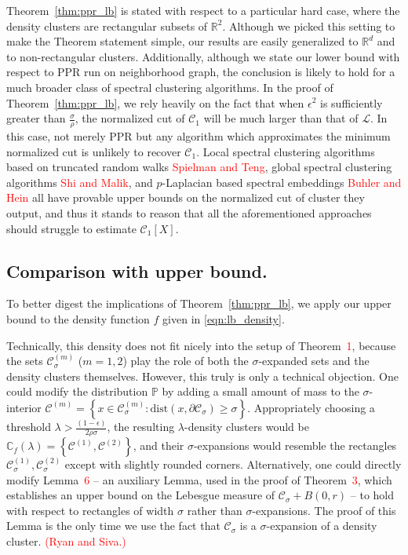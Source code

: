 \documentclass[11pt,twoside]{article}
\newcommand{\set}[1]{\left\{#1\right\}}
\newcommand{\Reals}{\mathbb{R}}
\newcommand{\1}{\mathbf{1}}
\newcommand{\dist}{\mathrm{dist}}
\newcommand{\Xbf}{X}             %
\newcommand{\Pbb}{\mathbb{P}}
\newcommand{\Cbb}{\mathbb{C}}
\newcommand{\Cset}{\mathcal{C}}
\newcommand{\Csig}{\Cset_{\sigma}}
\begin{document}
Theorem~\ref{thm:ppr_lb} is stated with respect to a particular hard case, where the density clusters are rectangular subsets of $\Reals^2$. Although we picked this setting to make the Theorem statement simple, our results are easily generalized to $\Reals^d$ and to non-rectangular clusters. Additionally, although we state our lower bound with respect to PPR run on neighborhood graph, the conclusion is likely to hold for a much broader class of spectral clustering algorithms. In the proof of Theorem~\ref{thm:ppr_lb}, we rely heavily on the fact that when $\epsilon^2$ is sufficiently greater than $\frac{\sigma}{\rho}$, the normalized cut of $\Cset_1$ will be much larger than that of $\mathcal{L}$. In this case, not merely PPR but any algorithm which approximates the minimum normalized cut is unlikely to recover $\Cset_1$. Local spectral clustering algorithms based on truncated random walks \textcolor{red}{Spielman and Teng}, global spectral clustering algorithms \textcolor{red}{Shi and Malik}, and $p$-Laplacian based spectral embeddings \textcolor{red}{Buhler and Hein} all have provable upper bounds on the normalized cut of cluster they output, and thus it stands to reason that all the aforementioned approaches should struggle to estimate $\Cset_1[\Xbf]$.

\subsection{Comparison with upper bound.}

To better digest the implications of Theorem~\ref{thm:ppr_lb}, we apply our upper bound to the density function $f$ given in \eqref{eqn:lb_density}.

Technically, this density does not fit nicely into the setup of Theorem~\textcolor{red}{1}, because the sets $\Cset_{\sigma}^{(m)}$ ($ m = 1,2$) play the role of both the $\sigma$-expanded sets and the density clusters themselves. However, this truly is only a technical objection. One could modify the distribution $\Pbb$ by adding a small amount of mass to the $\sigma$-interior $\Cset^{(m)} = \set{x \in \Cset_{\sigma}^{(m)}: \dist(x,\partial\Cset_{\sigma}) \geq \sigma}$. Appropriately choosing a threshold $\lambda > \frac{(1 - \epsilon)}{2\rho\sigma}$, the resulting $\lambda$-density clusters would be $\Cbb_f(\lambda) = \set{\Cset^{(1)},\Cset^{(2)}}$, and their $\sigma$-expansions would resemble the rectangles $\Csig^{(1)}, \Csig^{(2)}$ except with slightly rounded corners. 
Alternatively, one could directly modify Lemma~\textcolor{red}{6} -- an auxiliary Lemma, used in the proof of Theorem~\textcolor{red}{3}, which establishes an upper bound on the Lebesgue measure of $\Csig + B(0,r)$ -- to hold with respect to rectangles of width $\sigma$ rather than $\sigma$-expansions. The proof of this Lemma is the only time we use the fact that $\Csig$ is a $\sigma$-expansion of a density cluster. \textcolor{red}{(Ryan and Siva.)}
\end{document}
